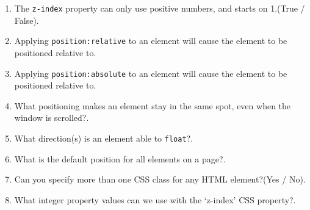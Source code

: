 \documentclass[11pt,a4paper]{article}
\begin{document}
\begin{enumerate}
\item  The \texttt{z-index} property can only use positive numbers, and starts on 1.(True / False)\underline{\hspace{3cm}}.
\item Applying \texttt{position:relative} to an element will cause the element to be positioned relative to\underline{\hspace{3cm}}.
\item Applying \texttt{position:absolute} to an element will cause the element to be positioned relative to\underline{\hspace{3cm}}.
\item What positioning makes an element stay in the same spot, even when the window is scrolled?\underline{\hspace{3cm}}.
\item What direction(s) is an element able to \texttt{float}?\underline{\hspace{3cm}}.
\item What is the default position for all elements on a page?\underline{\hspace{3cm}}.
\item Can you specify more than one CSS class for any HTML element?(Yes / No)\underline{\hspace{3cm}}.
\item What integer property values can we use with the `z-index' CSS property?\underline{\hspace{3cm}}.
\end{enumerate}
\end{document}
